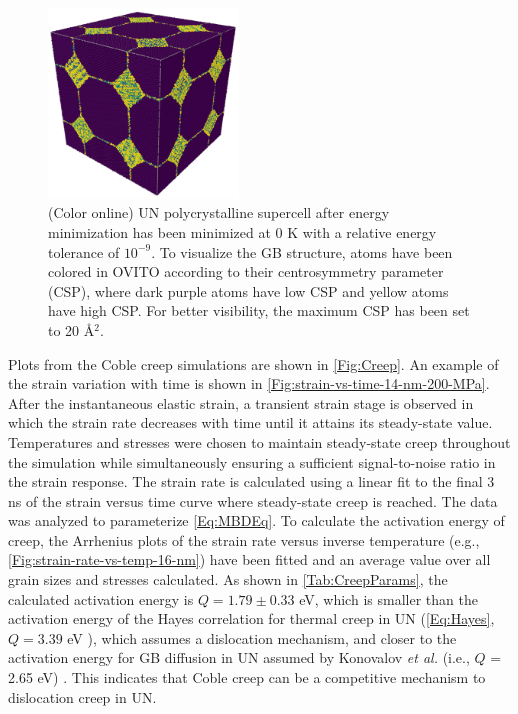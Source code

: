 \documentclass[preprint, 12pt]{elsarticle}
\newcommand{\?}{\stackrel{?}{=}}
\begin{document}
\begin{figure}[h]
    \centering
    \includegraphics[width=0.45\textwidth]{Structure.png}
    \caption{(Color online) UN polycrystalline supercell after energy minimization has been minimized at 0 K with a relative energy tolerance of $10^{-9}$. To visualize the GB structure, atoms have been colored in OVITO according to their centrosymmetry parameter (CSP), where dark purple atoms have low CSP and yellow atoms have high CSP. For better visibility, the maximum CSP has been set to 20 \AA$^{2}$.}
    \label{Fig:Structure}
\end{figure}

Plots from the Coble creep simulations are shown in \cref{Fig:Creep}. An example of the strain variation with time is shown in \cref{Fig:strain-vs-time-14-nm-200-MPa}. After the instantaneous elastic strain, a transient strain stage is observed in which the strain rate decreases with time until it attains its steady-state value. Temperatures and stresses were chosen to maintain steady-state creep throughout the simulation while simultaneously ensuring a sufficient signal-to-noise ratio in the strain response. The strain rate is calculated using a linear fit to the final 3 ns of the strain versus time curve where steady-state creep is reached. The data was analyzed to parameterize \cref{Eq:MBDEq}. To calculate the activation energy of creep, the Arrhenius plots of the strain rate versus inverse temperature (e.g., \cref{Fig:strain-rate-vs-temp-16-nm}) have been fitted and an average value over all grain sizes and stresses calculated. As shown in \cref{Tab:CreepParams}, the calculated activation energy is $Q = 1.79 \pm 0.33$ eV, which is smaller than the activation energy of the Hayes correlation for thermal creep in UN (\cref{Eq:Hayes}, $Q = 3.39$ eV \cite{Hayes1990II}), which assumes a dislocation mechanism, and closer to the activation energy for GB diffusion in UN assumed by Konovalov \textit{et al.} (i.e., $Q$ = 2.65 eV) \cite{Konovalov2016}. This indicates that Coble creep can be a competitive mechanism to dislocation creep in UN.
\end{document}
